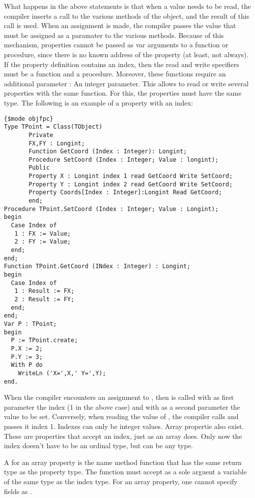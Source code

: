 What happens in the above statements is that when a value needs to be read,
the compiler inserts a call to the various  methods of the
object, and the result of this call is used. When an assignment is made,
the compiler passes the value that must be assigned as a paramater to
the various  methods.
Because of this mechanism, properties cannot be passed as var arguments to a
function or procedure, since there is no known address of the property (at
least, not always).
If the property definition contains an index, then the read and write
specifiers must be a function and a procedure. Moreover, these functions
require an additional parameter : An integer parameter. This allows to read
or write several properties with the same function. For this, the properties
must have the same type.
The following is an example of a property with an index:
\begin{verbatim}
{$mode objfpc}
Type TPoint = Class(TObject)
       Private
       FX,FY : Longint;
       Function GetCoord (Index : Integer): Longint;
       Procedure SetCoord (Index : Integer; Value : longint);
       Public
       Property X : Longint index 1 read GetCoord Write SetCoord;
       Property Y : Longint index 2 read GetCoord Write SetCoord;
       Property Coords[Index : Integer]:Longint Read GetCoord;
       end;
Procedure TPoint.SetCoord (Index : Integer; Value : Longint);
begin
  Case Index of
   1 : FX := Value;
   2 : FY := Value;
  end;
end;
Function TPoint.GetCoord (INdex : Integer) : Longint;
begin
  Case Index of
   1 : Result := FX;
   2 : Result := FY;
  end;
end;
Var P : TPoint;
begin
  P := TPoint.create;
  P.X := 2;
  P.Y := 3;
  With P do
    WriteLn ('X=',X,' Y=',Y);
end.
\end{verbatim}
When the compiler encounters an assignment to , then 
is called with as first parameter the index (1 in the above case) and with
as a second parameter the value to be set.
Conversely, when reading the value of , the compiler calls
 and passes it index 1.
Indexes can only be integer values.
Array propertie also exist. These are properties that accept an
index, just as an array does. Only now the index doesn't have to be an
ordinal type, but can be any type.

A  for an array property is the name method function
that has the same return type as  the property type.
The function must accept as a sole arguent a variable of the same type as
the index type. For an array property, one cannot specify fields as .

